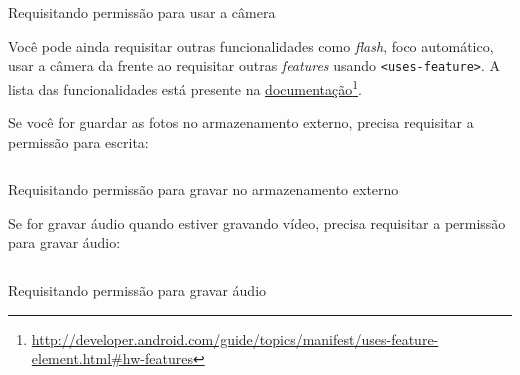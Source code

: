 \documentclass[a4paper,12pt,brazil,oneside]{book}
\begin{document}
		\begin{listing}[H]
		\inputminted[linenos=true,fontsize=\small,frame=lines, framesep=2mm, tabsize=2,numbersep=5pt]{xml}{src/api/camera/permission.xml}
		\caption{Requisitando permissão para usar a câmera}
		\label{code:camera-permission}
		\end{listing} 	

		Você pode ainda requisitar outras funcionalidades como \emph{flash}, foco automático, usar a câmera da frente ao requisitar outras \emph{features} usando \texttt{<uses-feature>}. A lista das funcionalidades está presente na \href{http://developer.android.com/guide/topics/manifest/uses-feature-element.html\#hw-features}{documentação}\footnote{\href{http://developer.android.com/guide/topics/manifest/uses-feature-element.html\#hw-features}{http://developer.android.com/guide/topics/manifest/uses-feature-element.html\#hw-features}}.
		
		Se você for guardar as fotos no armazenamento externo, precisa requisitar a permissão para escrita:

		\begin{listing}[H]
		\inputminted[linenos=true,fontsize=\small,frame=lines, framesep=2mm, tabsize=2,numbersep=5pt]{xml}{src/api/camera/permission2.xml}
		\caption{Requisitando permissão para gravar no armazenamento externo}
		\label{code:write-external-permission}
		\end{listing} 	

		Se for gravar áudio quando estiver gravando vídeo, precisa requisitar a permissão para gravar áudio:

		
		\begin{listing}[H]
		\inputminted[linenos=true,fontsize=\small,frame=lines, framesep=2mm, tabsize=2,numbersep=5pt]{xml}{src/api/camera/permission3.xml}
		\caption{Requisitando permissão para gravar áudio}
		\label{code:audio-permission}
		\end{listing} 	
		
\end{document}
